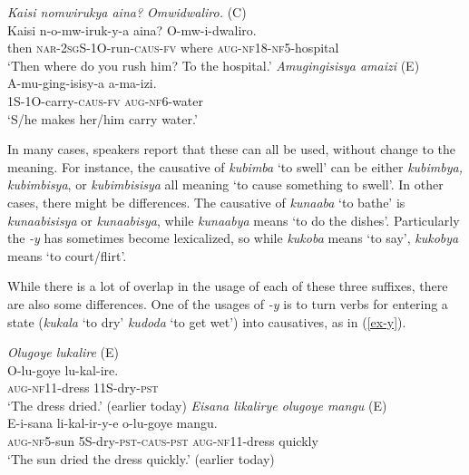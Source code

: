 \documentclass[output=paper,colorlinks,citecolor=brown,draftmode]{langscibook}
\begin{document}
\ea
\begin{xlist}   \label{ex-y-isisy}
 \ex \emph{Kaisi nomwirukya aina? Omwidwaliro.
 } (C) \\
  \gll  Kaisi n-o-mw-iruk-y-a aina? O-mw-i-dwaliro. \\ 
then \textsc{nar}-2\textsc{sg}S-1O-run-\textsc{caus}-\textsc{fv} where \textsc{aug}-\textsc{nf18}-\textsc{nf5}-hospital \\
    \glt  `Then where do you rush him? To the hospital.' 
     \ex \emph{Amugingisisya amaizi} (E)\\
  \gll A-mu-ging-isisy-a 		a-ma-izi.  \\ 
1S-1O-carry-\textsc{caus}-\textsc{fv} \textsc{aug-nf6}-water \\
    \glt  `S/he makes her/him carry water.' 
      \end{xlist}     
      \z

In many cases, speakers report that these can all be used, without change to the meaning. For instance, the causative of \emph{kubimba} `to swell' can be either \emph{kubimbya, kubimbisya}, or \emph{kubimbisisya} all meaning `to cause something to swell'. In other cases, there might be differences. The causative of \emph{kunaaba} `to bathe' is \emph{kunaabisisya} or \emph{kunaabisya}, while \emph{kunaabya} means `to do the dishes'.  Particularly the \emph{-y} has sometimes become lexicalized, so while \emph{kukoba} means `to say', \emph{kukobya} means `to court/flirt'.

While there is a lot of overlap in the usage of each of these three suffixes, there are also some differences. One of the usages of \emph{-y} is to turn verbs for entering a state (\emph{kukala} `to dry' \emph{kudoda} `to get wet') into causatives, as in (\ref{ex-y}). 


\ea
\begin{xlist}   \label{ex-y}
 \ex \emph{Olugoye lukalire} (E)\\
  \gll  O-lu-goye lu-kal-ire. \\ 
\textsc{aug-nf11}-dress 11S-dry-\textsc{pst} \\
    \glt  `The dress dried.' (earlier today) 
     \ex \emph{Eisana likalirye olugoye mangu} (E) \\
  \gll  E-i-sana li-kal-ir-y-e o-lu-goye mangu. \\ 
\textsc{aug-nf5}-sun 5S-dry-\textsc{pst-caus-pst} \textsc{aug-nf11}-dress quickly \\
    \glt  `The sun dried the dress quickly.' (earlier today) 
      \end{xlist}     
      \z
\end{document}
